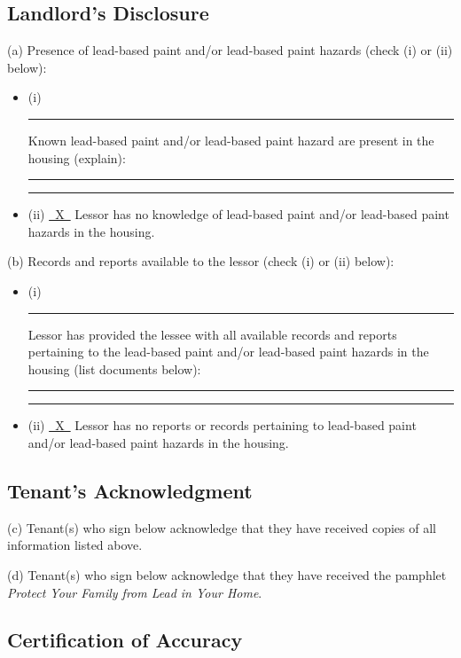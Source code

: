 \documentclass[12pt]{article}
\begin{document}
{\subsection*{Landlord's Disclosure}

(a) Presence of lead-based paint and/or lead-based paint hazards (check (i) or (ii) below):

\begin{itemize}[label={}, leftmargin=1.5em]
    \item (i) \rule{0.5cm}{0.4pt} Known lead-based paint and/or lead-based paint hazard are
    present in the housing (explain):\par
    \rule{\linewidth}{0.4pt}\par
    \rule{\linewidth}{0.4pt}

    \item (ii) \underline{\ X\ } Lessor has no knowledge of lead-based paint and/or
    lead-based paint hazards in the housing.
\end{itemize}

(b) Records and reports available to the lessor (check (i) or (ii) below):

\begin{itemize}[label={}, leftmargin=1.5em]
    \item (i) \rule{0.5cm}{0.4pt} Lessor has provided the lessee with all available records
    and reports pertaining to the lead-based paint and/or lead-based paint hazards in the
    housing (list documents below):\par
    \rule{\linewidth}{0.4pt}\par
    \rule{\linewidth}{0.4pt}

    \item (ii) \underline{\ X\ } Lessor has no reports or records pertaining to lead-based
    paint and/or lead-based paint hazards in the housing.
\end{itemize}

\subsection*{Tenant's Acknowledgment}

(c) Tenant(s) who sign below acknowledge that they have received copies of all information
listed above.

(d) Tenant(s) who sign below acknowledge that they have received the pamphlet \textit{Protect
Your Family from Lead in Your Home}.

\subsection*{Certification of Accuracy}

}
\end{document}
